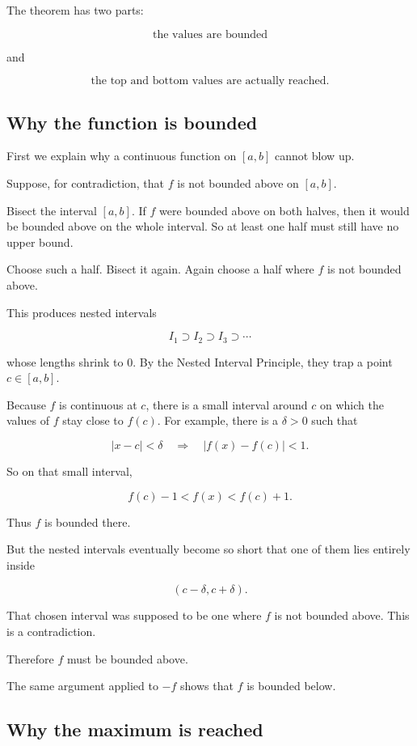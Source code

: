 The theorem has two parts:

\[
\text{the values are bounded}
\]

and

\[
\text{the top and bottom values are actually reached.}
\]

\subsection{Why the function is bounded}
\label{appsubsec:evt-bounded-proof}

First we explain why a continuous function on \([a,b]\) cannot blow up.

Suppose, for contradiction, that \(f\) is not bounded above on \([a,b]\).

Bisect the interval \([a,b]\).  If \(f\) were bounded above on both halves, then it would
be bounded above on the whole interval.  So at least one half must still have no upper
bound.

Choose such a half.  Bisect it again.  Again choose a half where \(f\) is not bounded
above.

This produces nested intervals

\[
I_1\supset I_2\supset I_3\supset\cdots
\]

whose lengths shrink to \(0\).  By the Nested Interval Principle, they trap a point
\(c\in[a,b]\).

Because \(f\) is continuous at \(c\), there is a small interval around \(c\) on which the
values of \(f\) stay close to \(f(c)\).  For example, there is a \(\delta>0\) such that

\[
|x-c|<\delta
\quad\Longrightarrow\quad
|f(x)-f(c)|<1.
\]

So on that small interval,

\[
f(c)-1<f(x)<f(c)+1.
\]

Thus \(f\) is bounded there.

But the nested intervals eventually become so short that one of them lies entirely inside

\[
(c-\delta,c+\delta).
\]

That chosen interval was supposed to be one where \(f\) is not bounded above.  This is
a contradiction.

Therefore \(f\) must be bounded above.

The same argument applied to \(-f\) shows that \(f\) is bounded below.

\subsection{Why the maximum is reached}
\label{appsubsec:evt-maximum-proof}

